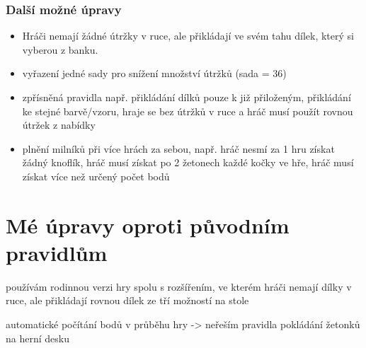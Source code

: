\subsubsection*{Další možné úpravy}
\begin{itemize}
    \item Hráči nemají žádné útržky v ruce, ale přikládají ve svém tahu dílek, který si vyberou z banku.
    \item vyřazení jedné sady pro snížení množství útržků (sada = 36)
    \item zpřísněná pravidla např. přikládání dílků pouze k již přiloženým, přikládání ke stejné barvě/vzoru, hraje se bez útržků v ruce a hráč musí použít rovnou útržek z nabídky
    \item plnění milníků při více hrách za sebou, např. hráč nesmí za 1 hru získat žádný knoflík, hráč musí získat po 2 žetonech každé kočky ve hře, hráč musí získat více než určený počet bodů
\end{itemize}

\section{Mé úpravy oproti původním pravidlům}

používám rodinnou verzi hry spolu s rozšířením, ve kterém hráči nemají dílky v ruce, ale přikládají rovnou dílek ze tří možností na stole

automatické počítání bodů v průběhu hry -> neřeším pravidla pokládání žetonků na herní desku

